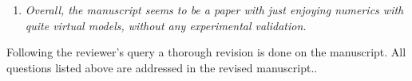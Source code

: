 \documentclass[a4paper]{article}
\begin{document}
\begin{enumerate}
\item
\textit{Overall, the manuscript seems to be a paper with just enjoying numerics with quite virtual models, without any experimental validation.}
\vspace{.2cm}


\end{enumerate}

Following the reviewer's query a thorough revision is done on the manuscript. All questions listed above are addressed in the revised manuscript..

\end{document}

